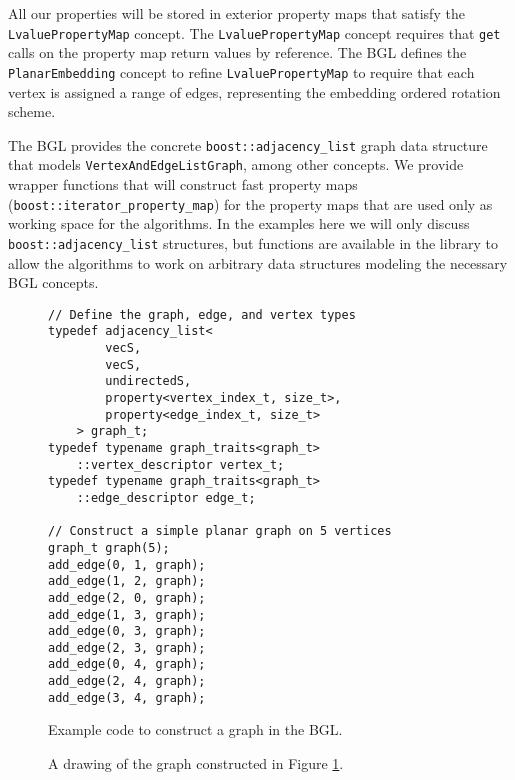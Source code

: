 \documentclass[letterpaper, 12pt]{article}
\theoremstyle{thm}
\begin{document}
All our properties will be stored in exterior property maps that satisfy the
\texttt{Lvalue{\allowbreak}Property{\allowbreak}Map} concept. The \texttt{Lvalue{\allowbreak}Property{\allowbreak}Map} concept requires
that \texttt{get} calls on the property map return values by reference.
The BGL defines the \texttt{PlanarEmbedding} concept to refine
\texttt{Lvalue{\allowbreak}Property{\allowbreak}Map} to require that each vertex is assigned a range of
edges, representing the embedding ordered rotation scheme.

The BGL provides the concrete \texttt{boost::adjacency\_list} graph data structure that
models \texttt{VertexAndEdgeListGraph}, among other concepts. We provide wrapper
functions that will construct fast property maps (\texttt{boost::iterator\_property\_map})
for the property maps that are used only as working space for the algorithms.
In the examples here we will only discuss \texttt{boost::adjacency\_list} structures,
but functions are available in the library to allow the algorithms to work on
arbitrary data structures modeling the necessary BGL concepts.

\begin{figure}
\begin{lstlisting}[frame=single]
// Define the graph, edge, and vertex types
typedef adjacency_list<
        vecS,
        vecS,
        undirectedS,
        property<vertex_index_t, size_t>,
        property<edge_index_t, size_t>
    > graph_t;
typedef typename graph_traits<graph_t>
    ::vertex_descriptor vertex_t;
typedef typename graph_traits<graph_t>
    ::edge_descriptor edge_t;

// Construct a simple planar graph on 5 vertices
graph_t graph(5);
add_edge(0, 1, graph);
add_edge(1, 2, graph);
add_edge(2, 0, graph);
add_edge(1, 3, graph);
add_edge(0, 3, graph);
add_edge(2, 3, graph);
add_edge(0, 4, graph);
add_edge(2, 4, graph);
add_edge(3, 4, graph);
\end{lstlisting}
\caption{Example code to construct a graph in the BGL.}
\label{example_make_graph}
\end{figure}

\begin{figure}
\begin{center}
\end{center}
\caption{A drawing of the graph constructed in Figure \ref{example_make_graph}.}
\end{figure}
\end{document}
